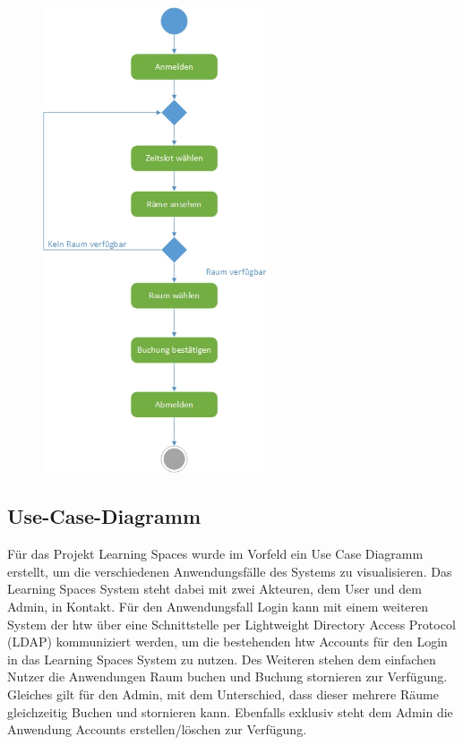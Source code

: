 \documentclass[a4paper,12pt]{article}
\begin{document}
\begin{figure}[h]
\begin{center}
\includegraphics[width=0.6\textwidth]{Bilder/Aktivitaetsdiagramm}\label{Aktivitaetsdiagramm}
\end{center}
\end{figure}

\subsection{Use-Case-Diagramm}
Für das Projekt Learning Spaces wurde im Vorfeld ein Use Case Diagramm erstellt, um die verschiedenen Anwendungsfälle des Systems zu visualisieren. Das Learning Spaces System steht dabei mit zwei Akteuren, dem User und dem Admin, in Kontakt. Für den Anwendungsfall Login kann mit einem weiteren System der htw über eine Schnittstelle per Lightweight Directory Access Protocol (LDAP) kommuniziert werden, um die bestehenden htw Accounts für den Login in das Learning Spaces System zu nutzen. Des Weiteren stehen dem einfachen Nutzer die Anwendungen Raum buchen und Buchung stornieren zur Verfügung. Gleiches gilt für den Admin, mit dem Unterschied, dass dieser mehrere Räume gleichzeitig Buchen und stornieren kann. Ebenfalls exklusiv steht dem Admin die Anwendung Accounts erstellen/löschen zur Verfügung.\\
\end{document}
